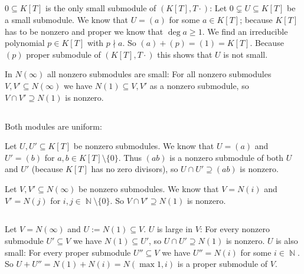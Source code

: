 \documentclass[a4paper,10pt]{article}
\theoremstyle{definition}
\newcommand{\N}{\operatorname{\mathbb{N}}}
\begin{document}
\subsection{}
$0 \subseteq K[T]$ is the only small submodule of $(K[T],T\cdot)$: Let $0 \subsetneq U \subseteq K[T]$ be a small submodule. We know that $U = (a)$ for some $a \in K[T]$; because $K[T]$ has to be nonzero and proper we know that $\deg a \geq 1$. We find an irreducible polynomial $p \in K[T]$ with $p \nmid a$. So $(a) + (p) = (1) = K[T]$. Because $(p)$ proper submodule of $(K[T],T\cdot)$ this shows that $U$ is not small.

In $N(\infty)$ all nonzero submodules are small: For all nonzero submodules $V, V' \subseteq N(\infty)$ we have $N(1) \subseteq V, V'$ as a nonzero submodule, so $V \cap V' \supseteq N(1)$ is nonzero.

\subsection{}
Both modules are uniform:

Let $U, U' \subseteq K[T]$ be nonzero submodules. We know that $U = (a)$ and $U' = (b)$ for $a,b \in K[T] \setminus \{0\}$. Thus $(ab)$ is a nonzero submodule of both $U$ and $U'$ (because $K[T]$ has no zero divisors), so $U \cap U' \supseteq (ab)$ is nonzero.

Let $V, V' \subseteq N(\infty)$ be nonzero submodules. We know that $V = N(i)$ and $V' = N(j)$ for $i,j \in \N \setminus \{0\}$. So $V \cap V' \supseteq N(1)$ is nonzero.

\subsection{}
Let $V = N(\infty)$ and $U := N(1) \subseteq V$. $U$ is large in $V$: For every nonzero submodule $U' \subseteq V$ we have $N(1) \subseteq U'$, so $U \cap U' \supseteq N(1)$ is nonzero. $U$ is also small: For every proper submodule $U'' \subseteq V$ we have $U'' = N(i)$ for some $i \in \N$. So $U + U'' = N(1) + N(i) = N(\max{1,i})$ is a proper submodule of $V$.
\end{document}
